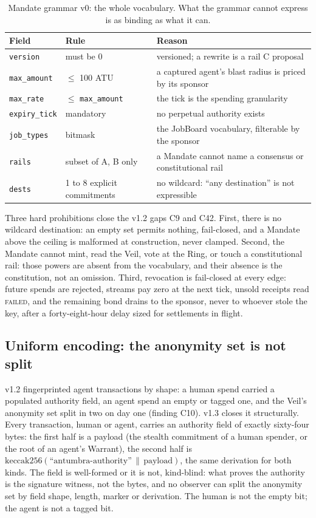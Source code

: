\begin{table}[htbp]
\centering
\small
\caption{Mandate grammar v0: the whole vocabulary. What the
grammar cannot express is as binding as what it can.}
\label{tab:mandate}
\begin{tabularx}{\textwidth}{@{}L{3.4cm}YY@{}}
\toprule
Field & Rule & Reason \\
\midrule
\texttt{version} & must be 0 & versioned; a rewrite is a rail C proposal \\
\texttt{max\_amount} & $\leq$ 100 ATU & a captured agent's blast radius is priced by its sponsor \\
\texttt{max\_rate} & $\leq$ \texttt{max\_amount} & the tick is the spending granularity \\
\texttt{expiry\_tick} & mandatory & no perpetual authority exists \\
\texttt{job\_types} & bitmask & the JobBoard vocabulary, filterable by the sponsor \\
\texttt{rails} & subset of A, B only & a Mandate cannot name a consensus or constitutional rail \\
\texttt{dests} & 1 to 8 explicit commitments & no wildcard: ``any destination'' is not expressible \\
\bottomrule
\end{tabularx}
\end{table}

Three hard prohibitions close the v1.2 gaps C9 and C42. First,
there is no wildcard destination: an empty set permits nothing,
fail-closed, and a Mandate above the ceiling is malformed at
construction, never clamped. Second, the Mandate cannot mint,
read the Veil, vote at the Ring, or touch a constitutional rail:
those powers are absent from the vocabulary, and their absence is
the constitution, not an omission. Third, revocation is
fail-closed at every edge: future spends are rejected, streams
pay zero at the next tick, unsold receipts read \textsc{failed},
and the remaining bond drains to the sponsor, never to whoever
stole the key, after a forty-eight-hour delay sized for
settlements in flight.

\subsection{Uniform encoding: the anonymity set is not split}

v1.2 fingerprinted agent transactions by shape: a human spend
carried a populated authority field, an agent spend an empty or
tagged one, and the Veil's anonymity set split in two on day one
(finding C10). v1.3 closes it structurally. Every transaction,
human or agent, carries an authority field of exactly sixty-four
bytes: the first half is a payload (the stealth commitment of a
human spender, or the root of an agent's Warrant), the second
half is $\mathrm{keccak256}(\text{``antumbra-authority''} \,\|\,
\text{payload})$, the same derivation for both kinds. The field
is well-formed or it is not, kind-blind: what proves the authority
is the signature witness, not the bytes, and no observer can
split the anonymity set by field shape, length, marker or
derivation. The human is not the empty bit; the agent is not a
tagged bit.


